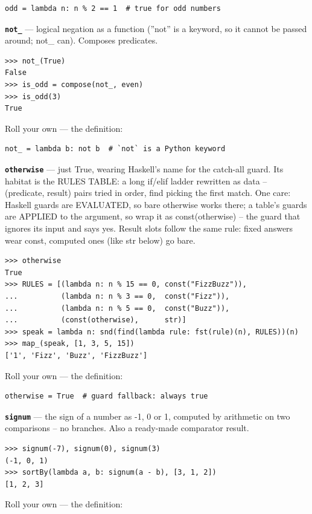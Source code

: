 \documentclass[10pt,letterpaper]{article}
\begin{document}
\begin{lstlisting}[style=ex]
odd = lambda n: n % 2 == 1  # true for odd numbers
\end{lstlisting}
\textbf{\texttt{not\_}} --- logical negation as a function (''not'' is a keyword, so it cannot be passed around; not\_ can). Composes predicates.
\begin{lstlisting}[style=ex]
>>> not_(True)
False
>>> is_odd = compose(not_, even)
>>> is_odd(3)
True
\end{lstlisting}

Roll your own --- the definition:

\begin{lstlisting}[style=ex]
not_ = lambda b: not b  # `not` is a Python keyword
\end{lstlisting}
\textbf{\texttt{otherwise}} --- just True, wearing Haskell's name for the catch-all guard. Its habitat is the RULES TABLE: a long if/elif ladder rewritten as data -- (predicate, result) pairs tried in order, find picking the first match. One care: Haskell guards are EVALUATED, so bare otherwise works there; a table's guards are APPLIED to the argument, so wrap it as const(otherwise) -- the guard that ignores its input and says yes. Result slots follow the same rule: fixed answers wear const, computed ones (like str below) go bare.
\begin{lstlisting}[style=ex]
>>> otherwise
True
>>> RULES = [(lambda n: n % 15 == 0, const("FizzBuzz")),
...          (lambda n: n % 3 == 0,  const("Fizz")),
...          (lambda n: n % 5 == 0,  const("Buzz")),
...          (const(otherwise),      str)]
>>> speak = lambda n: snd(find(lambda rule: fst(rule)(n), RULES))(n)
>>> map_(speak, [1, 3, 5, 15])
['1', 'Fizz', 'Buzz', 'FizzBuzz']
\end{lstlisting}

Roll your own --- the definition:

\begin{lstlisting}[style=ex]
otherwise = True  # guard fallback: always true
\end{lstlisting}
\textbf{\texttt{signum}} --- the sign of a number as -1, 0 or 1, computed by arithmetic on two comparisons -- no branches. Also a ready-made comparator result.
\begin{lstlisting}[style=ex]
>>> signum(-7), signum(0), signum(3)
(-1, 0, 1)
>>> sortBy(lambda a, b: signum(a - b), [3, 1, 2])
[1, 2, 3]
\end{lstlisting}

Roll your own --- the definition:
\end{document}
